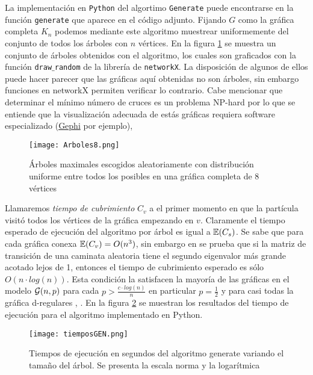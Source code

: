 La implementación en \texttt{Python} del algortimo \texttt{Generate} puede encontrarse en la función \texttt{generate} que aparece en el código adjunto. Fijando $G$ como la gráfica completa $K_{n}$ podemos mediante este algoritmo muestrear uniformemente del conjunto de todos los árboles con $n$ vértices. En la figura \ref{fig:Arboles8} se muestra un conjunto de árboles obtenidos con el algoritmo, los cuales son graficados con la función \texttt{draw$\_$random} de la librería de \texttt{networkX}. La disposición de algunos de ellos puede hacer parecer que las gráficas aquí obtenidas no son árboles, sin embargo funciones en networkX permiten verificar lo contrario. Cabe mencionar que determinar el mínimo número de cruces es un problema NP-hard por lo que se entiende que la visualización adecuada de estás gráficas requiera software especializado (\href{https://gephi.org/}{Gephi} por ejemplo), 

\begin{figure}[h!]
	\centering
	\texttt{[image: Arboles8.png]}
	\caption{Árboles maximales escogidos aleatoriamente con distribución uniforme entre todos los posibles en una gráfica completa de $8$ vértices}
	\label{fig:Arboles8}
\end{figure}

Llamaremos \textit{tiempo de cubrimiento} $C_{v}$ a el primer momento en que la partícula visitó todos los vértices de la gráfica empezando en $v$. Claramente el tiempo esperado de ejecución del algoritmo por árbol es igual a $\mathbb{E}(C_{s})$. Se sabe que para cada gráfica conexa $\mathbb{E}(C_{v}) = O(n^{3})$, sin embargo en \cite{BS89} se prueba que si la matriz de transición de una caminata aleatoria tiene el segundo eigenvalor más grande acotado lejos de 1, entonces el tiempo de cubrimiento esperado es sólo $O(n\cdot log(n))$. Esta condición la satisfacen la mayoría de las gráficas en el modelo $\mathcal{G}(n,p)$ para cada $p > \frac{c\cdot log(n)}{n}$ en particular $p=\frac{1}{2}$ y para casi todas la gráfica d-regulares \cite{BS87}, \cite{FKS89}. En la figura \ref{fig:tiemposGEN} se muestran los resultados del tiempo de ejecución para el algoritmo implementado en Python.

\begin{figure}[h!]
	\centering
	\texttt{[image: tiemposGEN.png]}
	\caption{Tiempos de ejecución en segundos del algoritmo generate variando el tamaño del árbol. Se presenta la escala norma y la logarítmica}
	\label{fig:tiemposGEN}
\end{figure}
